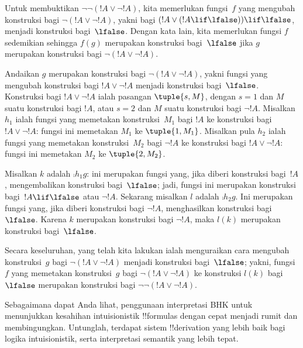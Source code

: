 \documentclass[../../../include/open-logic-section]{subfiles}
\begin{document}
\begin{ex}
Untuk membuktikan $\lnot \lnot (!A \lor \lnot !A)$, kita memerlukan fungsi~$f$
yang mengubah konstruksi bagi $\lnot(!A \lor \lnot !A)$, yakni bagi $(!A \lor
(!A \lif \lfalse)) \lif \lfalse$, menjadi konstruksi bagi~$\lfalse$. Dengan
kata lain, kita memerlukan fungsi $f$ sedemikian sehingga $f(g)$ merupakan
konstruksi bagi~$\lfalse$ jika $g$ merupakan konstruksi bagi $\lnot(!A \lor
\lnot !A)$.

Andaikan $g$ merupakan konstruksi bagi $\lnot(!A \lor \lnot !A)$, yakni fungsi
yang mengubah konstruksi bagi $!A \lor \lnot !A$ menjadi konstruksi
bagi~$\lfalse$. Konstruksi bagi $!A \lor \lnot !A$ ialah pasangan
$\tuple{s, M}$, dengan $s = 1$ dan $M$ suatu konstruksi bagi $!A$, atau $s = 2$
dan $M$ suatu konstruksi bagi $\lnot !A$. Misalkan $h_1$ ialah fungsi yang
memetakan konstruksi~$M_1$ bagi $!A$ ke konstruksi bagi $!A \lor \lnot !A$:
fungsi ini memetakan $M_1$ ke $\tuple{1, M_1}$. Misalkan pula $h_2$ ialah
fungsi yang memetakan konstruksi~$M_2$ bagi $\lnot !A$ ke konstruksi bagi
$!A \lor \lnot !A$: fungsi ini memetakan $M_2$ ke $\tuple{2, M_2}$.

Misalkan $k$ adalah $\comp{h_1}{g}$: ini merupakan fungsi yang, jika diberi
konstruksi bagi~$!A$, mengembalikan konstruksi bagi~$\lfalse$; jadi, fungsi ini
merupakan konstruksi bagi~$!A \lif \lfalse$ atau $\lnot !A$. Sekarang misalkan
$l$ adalah $\comp{h_2}{g}$. Ini merupakan fungsi yang, jika diberi konstruksi
bagi $\lnot !A$, menghasilkan konstruksi bagi~$\lfalse$. Karena $k$ merupakan
konstruksi bagi $\lnot !A$, maka $l(k)$ merupakan konstruksi bagi~$\lfalse$.

Secara keseluruhan, yang telah kita lakukan ialah menguraikan cara mengubah
konstruksi~$g$ bagi $\lnot(!A \lor \lnot !A)$ menjadi konstruksi
bagi~$\lfalse$; yakni, fungsi $f$ yang memetakan konstruksi~$g$ bagi
$\lnot(!A \lor \lnot !A)$ ke konstruksi $l(k)$ bagi~$\lfalse$ merupakan
konstruksi bagi $\lnot\lnot(!A \lor \lnot !A)$.
\end{ex}

Sebagaimana dapat Anda lihat, penggunaan interpretasi BHK untuk menunjukkan
kesahihan intuisionistik !!{formula}s dengan cepat menjadi rumit dan
membingungkan. Untunglah, terdapat sistem !!{derivation} yang lebih baik bagi
logika intuisionistik, serta interpretasi semantik yang lebih tepat.
\end{document}
